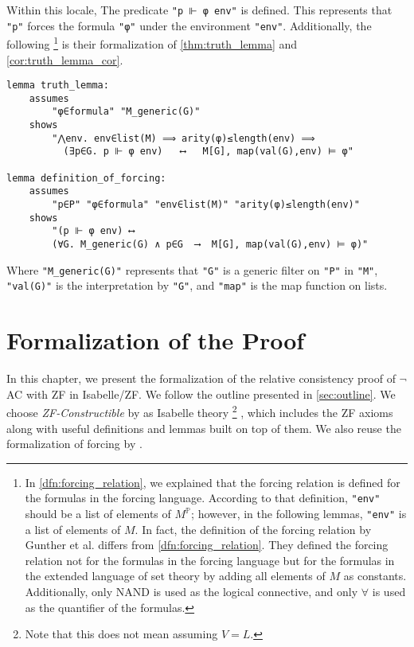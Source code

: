 \documentclass{report}
\newenvironment{isaframe}{\begin{mdframed}[topline=false, rightline=false, bottomline=false]}{\end{mdframed}}
\begin{document}
Within this locale, The predicate \texttt{"p ⊩ φ env"} is defined.
This represents that \texttt{"p"} forces the formula \texttt{"φ"} under the environment \texttt{"env"}.
Additionally, the following
\footnote{
In \cref{dfn:forcing_relation},
we explained that the forcing relation is defined for the formulas in the forcing language.
According to that definition, \texttt{"env"} should be a list of elements of $M^{\mathbb{P}}$;
however, in the following lemmas, \texttt{"env"} is a list of elements of $M$.
In fact, the definition of the forcing relation by Gunther et al. differs from \cref{dfn:forcing_relation}.
They defined the forcing relation not for the formulas in the forcing language 
but for the formulas in the extended language of set theory by adding all elements of $M$ as constants.
Additionally, only NAND is used as the logical connective, and only $\forall$ is used as the quantifier of the formulas.
} is their formalization of \cref{thm:truth_lemma} and \cref{cor:truth_lemma_cor}.
\begin{isaframe}
\begin{verbatim}
lemma truth_lemma:
    assumes 
        "φ∈formula" "M_generic(G)"
    shows 
        "⋀env. env∈list(M) ⟹ arity(φ)≤length(env) ⟹ 
          (∃p∈G. p ⊩ φ env)   ⟷   M[G], map(val(G),env) ⊨ φ"

lemma definition_of_forcing:
    assumes
        "p∈P" "φ∈formula" "env∈list(M)" "arity(φ)≤length(env)"
    shows
        "(p ⊩ φ env) ⟷
        (∀G. M_generic(G) ∧ p∈G  ⟶  M[G], map(val(G),env) ⊨ φ)"
\end{verbatim}
\end{isaframe}
Where \texttt{"M\_generic(G)"} represents that \texttt{"G"} is a generic filter on \texttt{"P"} in \texttt{"M"},
\texttt{"val(G)"} is the interpretation by \texttt{"G"},
and \texttt{"map"} is the map function on lists.




\chapter{Formalization of the Proof} 
In this chapter, we present the formalization of the relative consistency proof of $\neg$AC with ZF in Isabelle/ZF.
We follow the outline presented in \cref{sec:outline}.
We choose \emph{ZF-Constructible} by \cite{paulson_AC_consistency} as Isabelle theory 
\footnote{Note that this does not mean assuming $V=L$.}
, which includes the ZF axioms along with useful definitions and lemmas built on top of them.
We also reuse the formalization of forcing by \cite{gunther_forcing}.
\end{document}
